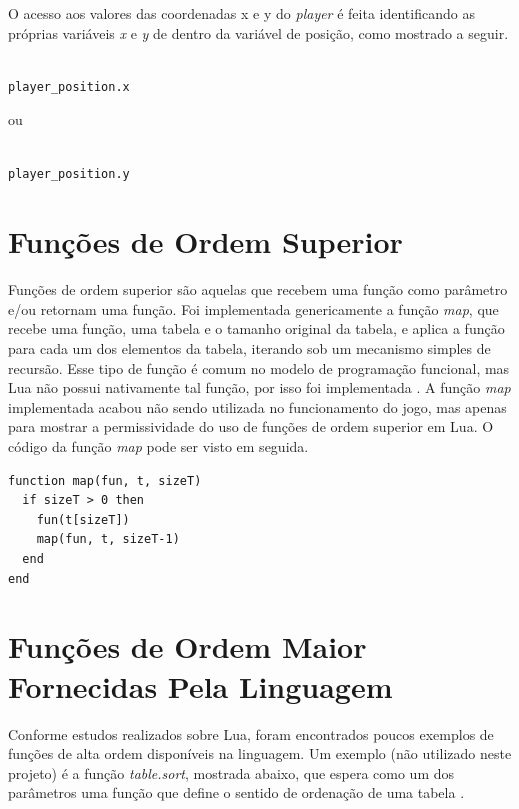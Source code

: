 \documentclass[rel_mlp]{iiufrgs}
\begin{document}
O acesso aos valores das coordenadas x e y do \textit{player} é feita identificando as próprias variáveis \textit{x} e \textit{y} de dentro da variável de posição, como mostrado a seguir.

\clearpage

\begin{lstlisting}

player_position.x

\end{lstlisting}

ou

\begin{lstlisting}

player_position.y

\end{lstlisting}



\section{Funções de Ordem Superior}

Funções de ordem superior são aquelas que recebem uma função como parâmetro e/ou retornam uma função. Foi implementada genericamente a função \textit{map}, que recebe uma função, uma tabela e o tamanho original da tabela, e aplica a função para cada um dos elementos da tabela, iterando sob um mecanismo simples de recursão. Esse tipo de função é comum no modelo de programação funcional, mas Lua não possui nativamente tal função, por isso foi implementada \cite{HigherOrderFunctionLua}. A função \textit{map} implementada acabou não sendo utilizada no funcionamento do jogo, mas apenas para mostrar a permissividade do uso de funções de ordem superior em Lua. O código da função \textit{map} pode ser visto em seguida.

\begin{lstlisting}
function map(fun, t, sizeT)
  if sizeT > 0 then
    fun(t[sizeT])
    map(fun, t, sizeT-1)
  end
end
\end{lstlisting}

\section{Funções de Ordem Maior Fornecidas Pela Linguagem}

Conforme estudos realizados sobre Lua, foram encontrados poucos exemplos de funções de alta ordem disponíveis na linguagem. Um exemplo (não utilizado neste projeto) é a função \textit{table.sort}, mostrada abaixo, que espera como um dos parâmetros uma função que define o sentido de ordenação de uma tabela \cite{FunctionsLua}.
\end{document}
